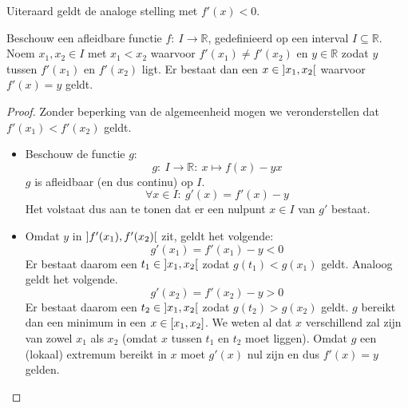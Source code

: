 \documentclass[main.tex]{subfiles}
\begin{document}
\begin{opm}
  \label{opm:opmerking-bij-lemma-dalend-in-punt-dan-lager-punt-erachter}
  Uiteraard geldt de analoge stelling met $f'(x) < 0$.
\end{opm}

\begin{bst}
  Beschouw een afleidbare functie $f:\ I \rightarrow \mathbb{R}$, gedefinieerd op een interval $I \subseteq \mathbb{R}$.
  Noem $x_{1},x_{2} \in I$ met $x_{1}< x_{2}$ waarvoor $f'(x_{1}) \neq f'(x_{2})$ en $y\in \mathbb{R}$ zodat $y$ tussen $f'(x_{1})$ en $f'(x_{2})$ ligt.
  Er bestaat dan een $x \in \interval[open]{x_{1}}{x_{2}}$ waarvoor $f'(x) = y$ geldt.

  \begin{proof}
    Zonder beperking van de algemeenheid mogen we veronderstellen dat $f'(x_{1})<f'(x_{2})$ geldt.
    \begin{itemize}
    \item
      Beschouw de functie $g$:
      \[ g:\ I \rightarrow \mathbb{R}:\ x \mapsto f(x) -yx \]
      $g$ is afleidbaar (en dus continu) op $I$.
      \[ \forall x\in I:\ g'(x) = f'(x) -y \]
      Het volstaat dus aan te tonen dat er een nulpunt $x\in I$ van $g'$ bestaat.
    \item
      Omdat $y$ in $\interval[open]{f'(x_{1})}{f'(x_{2})}$ zit, geldt het volgende:
      \[ g'(x_{1}) = f'(x_{1})-y < 0 \]
      Er bestaat daarom een $t_{1} \in \interval[open]{x_{1}}{x_{2}}$ zodat $g(t_{1})<g(x_{1})$ geldt.
      Analoog geldt het volgende.
      \[ g'(x_{2}) = f'(x_{2})-y > 0 \]
      Er bestaat daarom een $t_{2} \in \interval[open]{x_{1}}{x_{2}}$ zodat $g(t_{2})>g(x_{2})$ geldt.
      $g$ bereikt dan een minimum in een $x\in \interval{x_{1}}{x_{2}}$.
      We weten al dat $x$ verschillend zal zijn van zowel $x_{1}$ als $x_{2}$ (omdat $x$ tussen $t_{1}$ en $t_{2}$ moet liggen).
      Omdat $g$ een (lokaal) extremum bereikt in $x$ moet $g'(x)$ nul zijn en dus $f'(x)=y$ gelden.
    \end{itemize}
  \end{proof}
\end{bst}
\end{document}
